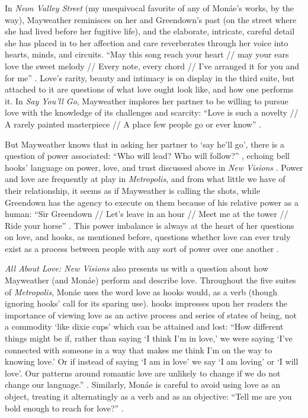 \documentclass[a4paper, 11pt]{article} %
\begin{document}
In \emph{Neon Valley Street} (my unequivocal favorite of any of Mon\'ae's works, by the way), Mayweather reminisces on her and Greendown's past (on the street where she had lived before her fugitive life), and the elaborate, intricate, careful detail she has placed in to her affection and care reverberates through her voice into hearts, minds, and circuits.
``May this song reach your heart // may your ears love the sweet melody // Every note, every chord // I've arranged it for you and for me'' \cite{neonvalleystreet}.
Love's rarity, beauty and intimacy is on display in the third suite, but attached to it are questions of what love ought look like, and how one performs it.
In \emph{Say You'll Go}, Mayweather implores her partner to be willing to pursue love with the knowledge of its challenges and scarcity:
``Love is such a novelty // A rarely painted masterpiece // A place few people go or ever know'' \cite{sayyouwillgo}.

But Mayweather knows that in asking her partner to `say he'll go', there is a question of power associated: ``Who will lead? Who will follow?''
 \cite{sayyouwillgo}, echoing bell hooks' language on power, love, and trust discussed above in \emph{New Visions} \cite{newvisions}.
Power and love are frequently at play in \emph{Metropolis}, and from what little we have of their relationship, it seems as if Mayweather is calling the shots, while Greendown has the agency to execute on them because of his relative power as a human: ``Sir Greendown // Let's leave in an hour // Meet me at the tower // Ride your horse'' \cite{greendown}.
This power imbalance is always at the heart of her questions on love, and hooks, as mentioned before, questions whether love can ever truly exist as a process between people with any sort of power over one another \cite{newvisions}.

\emph{All About Love: New Visions} also presents us with a question about how Mayweather (and Mon\'ae) perform and describe love.
Throughout the five suites of \emph{Metropolis}, Mon\'ae uses the word love as hooks would, as a verb (though ignoring hooks' call for its sparing use).
hooks impresses upon her readers the importance of viewing love as an active process and series of states of being, not a commodity `like dixie cups' which can be attained and lost:
``How different things might be if, rather than saying `I think I'm in love,' we were saying `I've connected with someone in a way that makes me think I'm on the way to knowing love.' Or if instead of saying `I am in love' we say `I am loving' or `I will love'. Our patterns around romantic love are unlikely to change if we do not change our language.'' \cite{newvisions}.
Similarly, Mon\'ae is careful to avoid using love as an object, treating it alternatingly as a verb and as an objective: ``Tell me are you bold enough to reach for love?'' \cite{manymoons}.
\end{document}
